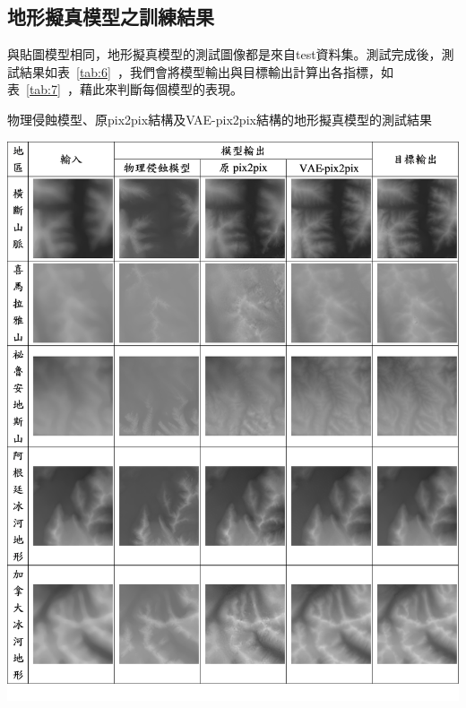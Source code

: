 \documentclass[a4paper, 12pt]{article}
\begin{document}
\subsection{地形擬真模型之訓練結果}
與貼圖模型相同，地形擬真模型的測試圖像都是來自test資料集。測試完成後，測試結果如表~\ref{tab:6}~，我們會將模型輸出與目標輸出計算出各指標，如表~\ref{tab:7}~，藉此來判斷每個模型的表現。
\begin{table}[htbp]
    \centering
    \caption{物理侵蝕模型、原pix2pix結構及VAE-pix2pix結構的地形擬真模型的測試結果}
    \label{tab:6}
    \includegraphics[width=0.9\linewidth]{fig/tab6.jpg}
\end{table}
\end{document}
